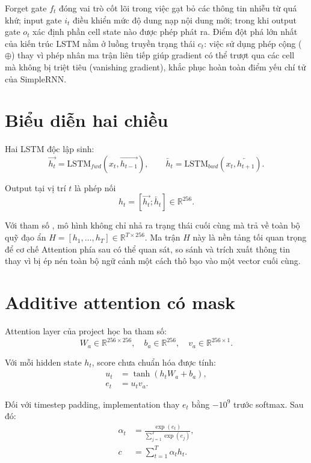 \documentclass[12pt]{report}
\newcommand{\codeword}[1]{\texttt{\detokenize{#1}}}
\begin{document}
Forget gate $f_t$ đóng vai trò cốt lõi trong việc gạt bỏ các thông tin nhiễu từ quá khứ; input gate $i_t$ điều khiển mức độ dung nạp nội dung mới; trong khi output gate $o_t$ xác định phần cell state nào được phép phát ra. Điểm đột phá lớn nhất của kiến trúc LSTM nằm ở luồng truyền trạng thái $c_t$: việc sử dụng phép cộng ($\oplus$) thay vì phép nhân ma trận liên tiếp giúp gradient có thể trượt qua các cell mà không bị triệt tiêu (vanishing gradient), khắc phục hoàn toàn điểm yếu chí tử của SimpleRNN.

\section{Biểu diễn hai chiều}

Hai LSTM độc lập sinh:
\[
\overrightarrow{h_t}
=\mathrm{LSTM}_{fwd}(x_t,\overrightarrow{h_{t-1}}),
\qquad
\overleftarrow{h_t}
=\mathrm{LSTM}_{bwd}(x_t,\overleftarrow{h_{t+1}}).
\]

Output tại vị trí $t$ là phép nối
\[
h_t=[\overrightarrow{h_t};\overleftarrow{h_t}]
\in\mathbb{R}^{256}.
\]

Với tham số \codeword{return_sequences=True}, mô hình không chỉ nhả ra trạng thái cuối cùng mà trả về toàn bộ quỹ đạo ẩn $H=[h_1,\ldots,h_T]\in\mathbb{R}^{T\times256}$. Ma trận $H$ này là nền tảng tối quan trọng để cơ chế Attention phía sau có thể quan sát, so sánh và trích xuất thông tin thay vì bị ép nén toàn bộ ngữ cảnh một cách thô bạo vào một vector cuối cùng.

\section{Additive attention có mask}

Attention layer của project học ba tham số:
\[
W_a\in\mathbb{R}^{256\times256},\quad
b_a\in\mathbb{R}^{256},\quad
v_a\in\mathbb{R}^{256\times1}.
\]

Với mỗi hidden state $h_t$, score chưa chuẩn hóa được tính:
\begin{align}
u_t &= \tanh(h_tW_a+b_a),\\
e_t &= u_tv_a.
\end{align}

Đối với timestep padding, implementation thay $e_t$ bằng $-10^9$ trước
softmax. Sau đó:
\begin{align}
\alpha_t &= \frac{\exp(e_t)}{\sum_{j=1}^{T}\exp(e_j)},\\
c &= \sum_{t=1}^{T}\alpha_t h_t.
\end{align}
\end{document}
